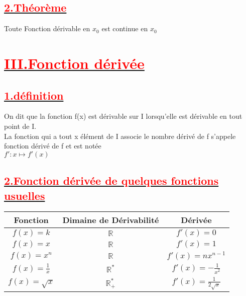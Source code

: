 \documentclass[12pt]{article}
\begin{document}
\subsection*{\underline{\textbf{\textcolor{red}{2.Théorème}}}}
Toute Fonction dérivable en $x_{0}$ est continue en $x_{0}$
\section*{\underline{\textbf{\textcolor{red}{III.Fonction dérivée}}}}
\subsection*{\underline{\textbf{\textcolor{red}{1.définition}}}}
On dit que la fonction f(x) est dérivable sur I lorsqu'elle est dérivable en tout point de I.\\
La fonction qui a tout x élément de I associe le nombre dérivé de  f s'appele fonction dérivé de f et est notée\\
$f':x\mapsto f'(x)$
\subsection*{\underline{\textbf{\textcolor{red}{2.Fonction dérivée de quelques fonctions usuelles}}}}
\begin{center}
\begin{tabular}{|c|c|c|}
\hline
Fonction &Dimaine de Dérivabilité &  Dérivée   \\
\hline
$f(x) = k$& $\mathbb{R}$ & $f'(x)=0$ \\
\hline
$f(x) = x$& $\mathbb{R}$ & $f'(x) = 1$ \\
\hline
$f(x) = x^{n}$& $\mathbb{R}$ & $f'(x) = nx^{n-1}$ \\
\hline
$f(x) = \frac{1}{x}$& $\mathbb{R}^{*}$ & $f'(x) = -\frac{1}{x^{2}}$ \\
\hline
$f(x) = \sqrt{x}$& $\mathbb{R}^{*}_{+}$ & $f'(x) = \frac{1}{2\sqrt{x}}$ \\
\hline
\end{tabular}
\end{center}
\end{document}
